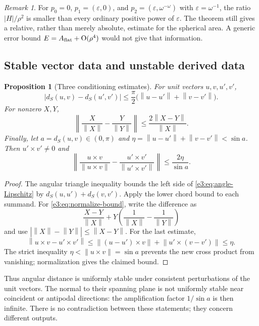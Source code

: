 \documentclass[11pt,letterpaper]{article}
\numberwithin{equation}{section}
\newtheorem{proposition}[proposition]{Proposition}
\theoremstyle{definition}
\theoremstyle{remark}
\newtheorem{remark}[remark]{Remark}
\newcommand{\eps}{\varepsilon}
\newcommand{\norm}[1]{\left\lVert#1\right\rVert}
\newcommand{\smallO}{\operatorname{O}}
\begin{document}
\begin{remark}
For $p_0=0$, $p_1=(\eps,0)$, and
$p_2=(\eps,\omega^{-\omega})$ with $\eps=\omega^{-1}$, the
ratio $|H|/\rho^2$ is smaller than every ordinary positive power of
$\eps$. The theorem still gives a relative, rather than merely
absolute, estimate for the spherical area. A generic error bound
$E=A_{\rm flat}+\smallO(\rho^4)$ would not give that information.
\end{remark}

\subsection{Stable vector data and unstable derived data}

\begin{proposition}[Three conditioning estimates]\label{e3:prop:conditioning}
For unit vectors $u,v,u',v'$,
\begin{equation}\label{e3:eq:angle-Lipschitz}
 |d_S(u,v)-d_S(u',v')|
 \le\frac\pi2\bigl(\norm{u-u'}+\norm{v-v'}\bigr).
\end{equation}
For nonzero $X,Y$,
\begin{equation}\label{e3:eq:normalize-bound}
 \left\|\frac X{\norm X}-\frac Y{\norm Y}\right\|
 \le\frac{2\norm{X-Y}}{\norm X}.
\end{equation}
Finally, let $a=d_S(u,v)\in(0,\pi)$ and
$\eta=\norm{u-u'}+\norm{v-v'}<\sin a$. Then $u'\times v'\ne0$ and
\begin{equation}\label{e3:eq:normal-bound}
 \left\|\frac{u\times v}{\norm{u\times v}}
       -\frac{u'\times v'}{\norm{u'\times v'}}\right\|
 \le\frac{2\eta}{\sin a}.
\end{equation}
\end{proposition}

\begin{proof}
The angular triangle inequality bounds the left side of
\cref{e3:eq:angle-Lipschitz} by
$d_S(u,u')+d_S(v,v')$. Apply the lower chord bound to each summand.
For \cref{e3:eq:normalize-bound}, write the difference as
\[
 \frac{X-Y}{\norm X}
 +Y\left(\frac1{\norm X}-\frac1{\norm Y}\right)
\]
and use $|\norm X-\norm Y|\le\norm{X-Y}$. For the last estimate,
\[
 \norm{u\times v-u'\times v'}
 \le\norm{(u-u')\times v}+\norm{u'\times(v-v')}
 \le\eta.
\]
The strict inequality $\eta<\norm{u\times v}=\sin a$ prevents the
new cross product from vanishing; normalization gives the claimed bound.
\end{proof}

Thus angular distance is uniformly stable under consistent perturbations
of the unit vectors. The normal to their spanning plane is not uniformly
stable near coincident or antipodal directions: the amplification factor
$1/\sin a$ is then infinite. There is no contradiction between these
statements; they concern different outputs.
\end{document}
